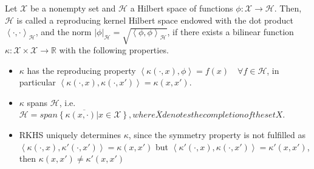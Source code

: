 \documentclass[runningheads]{llncs}
\newcommand{\Real}{\mathbb{R}}
\newenvironment{reviewer}{\setcounter{pointcounter}{1}}{}
\begin{document}
\begin{reviewer}
{{\begin{definition}
        Let $\mathcal{X}$ be a nonempty set and $\mathcal{H}$ a
        Hilbert space of functions $\phi: \mathcal{X} \rightarrow
        \mathcal{H}$. Then, $\mathcal{H}$ is called a reproducing
        kernel Hilbert space endowed with the dot product $\left<
        \cdot, \cdot\right>_{\mathcal{H}}$, and the norm $\left| \phi
        \right|_{\mathcal{H}} = \sqrt{\left< \phi,
        \phi\right>_{\mathcal{H}}}$, if there exists a bilinear
        function $\kappa: \mathcal{X} \times \mathcal{X} \rightarrow
        \Real$ with the following properties.
        \begin{itemize}
          \item $\kappa$ has the reproducing property $\left<
            \kappa(\cdot,x), \phi \right> = f(x) \quad \forall f \in
            \mathcal{H}$, in particular $\left< \kappa(\cdot,x),
            \kappa(\cdot,x') \right> = \kappa(x,x')$.
          \item $\kappa$ spans $\mathcal{H}$, i.e. $\mathcal{H} =
            \overline{span\left\{ \kappa\left( x,\cdot \right) | x
            \in \mathcal{X}\right\}}, where \overline{X} denotes the
            completion of the set X$.
          \item RKHS uniquely determines $\kappa$, since the symmetry
            property is not fulfilled as $\left< \kappa(\cdot,x),
            \kappa'(\cdot,x') \right> = \kappa(x,x')$ but $\left<
            \kappa'(\cdot,x), \kappa(\cdot,x') \right> =
            \kappa'(x,x')$, then $\kappa(x,x') \neq  \kappa'(x,x')$
        \end{itemize}
      \end{definition}
    }
  }


\end{reviewer}
\end{document}
